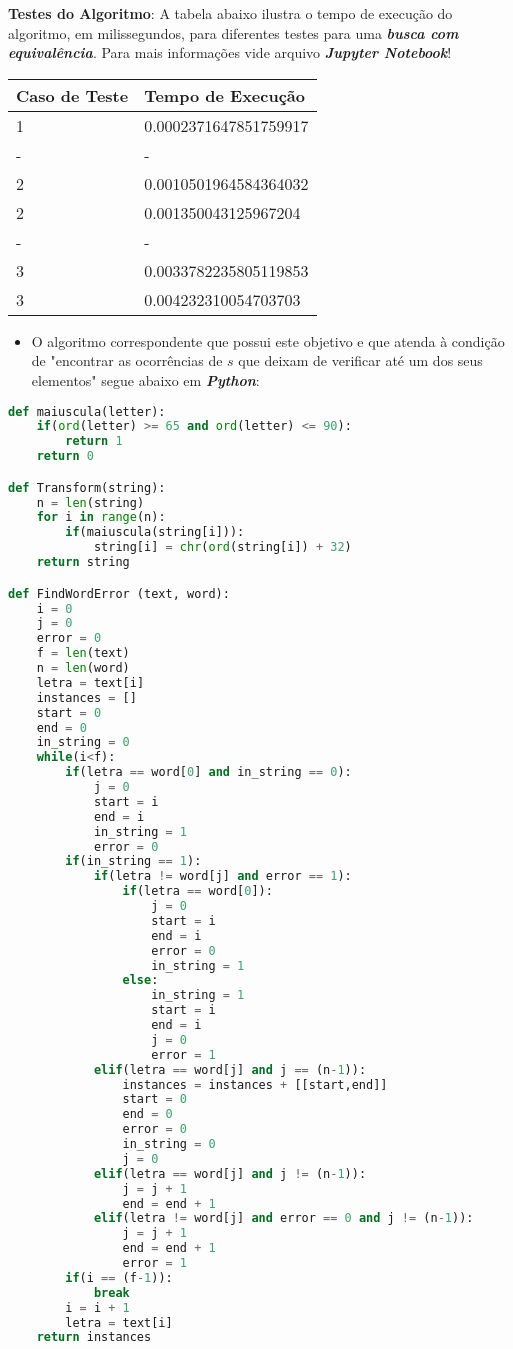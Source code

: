 \documentclass[paper=a4, fontsize=11pt]{scrartcl} %
\numberwithin{equation}{section} %
\numberwithin{figure}{section} %
\numberwithin{table}{section} %
\begin{document}
\textbf{Testes do Algoritmo}: A tabela abaixo ilustra o tempo de execução do algoritmo, em milissegundos, para diferentes testes para uma \emph{\textbf{busca com equivalência}}. Para mais informações vide arquivo \emph{\textbf{Jupyter Notebook}}!

\begin{table}[H]
\centering
\begin{tabular}{l|l}
Caso de Teste & Tempo de Execução \\\hline
1 & 0.0002371647851759917 \\
- & - \\
2 & 0.0010501964584364032 \\
2 & 0.001350043125967204 \\
- & - \\
3 & 0.0033782235805119853 \\
3 & 0.004232310054703703
\end{tabular}
\end{table}

\begin{itemize}
   \item O algoritmo correspondente que possui este objetivo e que atenda à condição de "encontrar as ocorrências de $s$ que deixam de verificar até um dos seus elementos" segue abaixo em \emph{\textbf{Python}}:
\end{itemize}

\begin{lstlisting}[language=Python, caption=String Python Algorithm]
def maiuscula(letter):
    if(ord(letter) >= 65 and ord(letter) <= 90):
        return 1
    return 0

def Transform(string):
    n = len(string)
    for i in range(n):
        if(maiuscula(string[i])):
            string[i] = chr(ord(string[i]) + 32)
    return string

def FindWordError (text, word):
    i = 0
    j = 0
    error = 0
    f = len(text)
    n = len(word)
    letra = text[i]
    instances = []
    start = 0
    end = 0
    in_string = 0
    while(i<f):
        if(letra == word[0] and in_string == 0):
            j = 0
            start = i
            end = i
            in_string = 1
            error = 0
        if(in_string == 1):
            if(letra != word[j] and error == 1):
                if(letra == word[0]):
                    j = 0
                    start = i
                    end = i
                    error = 0
                    in_string = 1
                else:
                    in_string = 1
                    start = i
                    end = i
                    j = 0
                    error = 1
            elif(letra == word[j] and j == (n-1)):
                instances = instances + [[start,end]]
                start = 0
                end = 0
                error = 0
                in_string = 0
                j = 0
            elif(letra == word[j] and j != (n-1)):
                j = j + 1
                end = end + 1
            elif(letra != word[j] and error == 0 and j != (n-1)):
                j = j + 1
                end = end + 1
                error = 1
        if(i == (f-1)):
            break
        i = i + 1
        letra = text[i]
    return instances
\end{lstlisting}
\end{document}
